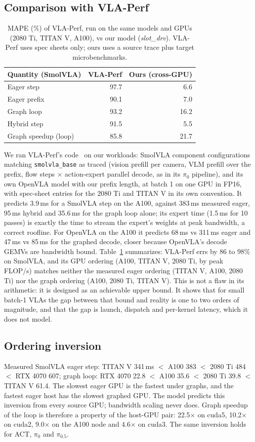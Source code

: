 \documentclass[10pt,twocolumn]{article}
\begin{document}
\subsection{Comparison with VLA-Perf}
\begin{table}[t]\centering\small
\begin{tabular}{lrr}\toprule
Quantity (SmolVLA) & VLA-Perf & Ours (cross-GPU)\\\midrule
Eager step & 97.7 & 6.6\\
Eager prefix & 90.1 & 7.0\\
Graph loop & 93.2 & 16.2\\
Hybrid step & 91.5 & 5.5\\
Graph speedup (loop) & 85.8 & 21.7\\\bottomrule
\end{tabular}
\caption{MAPE (\%) of VLA-Perf, run on the same models and GPUs (2080 Ti, TITAN V, A100), vs
our model (\emph{slot\_drv}). VLA-Perf uses spec sheets only; ours uses a source trace plus
target microbenchmarks.}\label{tab:vlaperf}
\end{table}
We ran VLA-Perf's code~\cite{vlaperf} on our workloads: SmolVLA component configurations
matching \texttt{smolvla\_base} as traced (vision prefill per camera, VLM prefill over the
prefix, flow steps $\times$ action-expert parallel decode, as in its $\pi_0$ pipeline), and its
own OpenVLA model with our prefix length, at batch 1 on one GPU in FP16, with spec-sheet
entries for the 2080 Ti and TITAN V in its own convention. It predicts 3.9\,ms for a SmolVLA
step on the A100, against 383\,ms measured eager, 95\,ms hybrid and 35.6\,ms for the graph loop
alone; its expert time (1.5\,ms for 10 passes) is exactly the time to stream the expert's
weights at peak bandwidth, a correct roofline. For OpenVLA on the A100 it predicts 68\,ms vs
311\,ms eager and 47\,ms vs 85\,ms for the graphed decode, closer because OpenVLA's decode
GEMVs are bandwidth bound. Table~\ref{tab:vlaperf} summarizes: VLA-Perf errs by 86 to 98\% on
SmolVLA, and its GPU ordering (A100, TITAN V, 2080 Ti, by peak FLOP/s) matches neither the
measured eager ordering (TITAN V, A100, 2080 Ti) nor the graph ordering (A100, 2080 Ti, TITAN V).
This is not a flaw in its arithmetic: it is designed as an achievable upper bound. It shows
that for small batch-1 VLAs the gap between that bound and reality is one to two orders of
magnitude, and that the gap is launch, dispatch and per-kernel latency, which it does not model.

\subsection{Ordering inversion}
Measured SmolVLA eager step: TITAN V 341\,ms $<$ A100 383 $<$ 2080 Ti 484 $<$ RTX 4070 607;
graph loop: RTX 4070 22.8 $<$ A100 35.6 $<$ 2080 Ti 39.8 $<$ TITAN V 61.4. The slowest eager GPU
is the fastest under graphs, and the fastest eager host has the slowest graphed GPU. The model
predicts this inversion from every source GPU; bandwidth scaling never does. Graph speedup of
the loop is therefore a property of the host-GPU pair: 22.5$\times$ on cuda5, 10.2$\times$ on
cuda2, 9.0$\times$ on the A100 node and 4.6$\times$ on cuda3. The same inversion holds for ACT,
$\pi_0$ and $\pi_{0.5}$.
\end{document}
